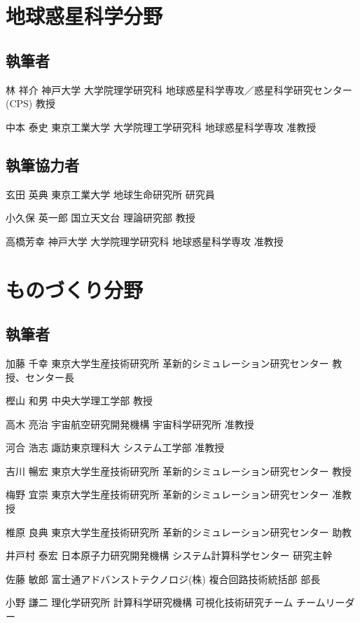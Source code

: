 \begin{執筆者一覧}
\section{地球惑星科学分野}
\subsection{執筆者}
\item
{林 祥介}
{神戸大学 大学院理学研究科 地球惑星科学専攻／惑星科学研究センター (CPS)}
{教授}
\item
{中本 泰史}
{東京工業大学 大学院理工学研究科 地球惑星科学専攻}
{准教授}
\subsection{執筆協力者}
\item
{玄田 英典}
{東京工業大学 地球生命研究所}
{研究員}
\item
{小久保 英一郎}
{国立天文台 理論研究部}
{教授}
\item
{高橋芳幸}
{神戸大学 大学院理学研究科 地球惑星科学専攻}
{准教授}
\section{ものづくり分野}
\subsection{執筆者}
\item
{加藤 千幸}
{東京大学生産技術研究所 革新的シミュレーション研究センター}
{教授、センター長}
\item
{樫山 和男}
{中央大学理工学部}
{教授}
\item
{高木 亮治}
{宇宙航空研究開発機構 宇宙科学研究所}
{准教授}
\item
{河合 浩志}
{諏訪東京理科大 システム工学部}
{准教授}
\item
{吉川 暢宏}
{東京大学生産技術研究所 革新的シミュレーション研究センター}
{教授}
\item
{梅野 宜崇}
{東京大学生産技術研究所 革新的シミュレーション研究センター}
{准教授}
\item
{椎原 良典}
{東京大学生産技術研究所 革新的シミュレーション研究センター}
{助教}
\item
{井戸村 泰宏}
{日本原子力研究開発機構 システム計算科学センター}
{研究主幹}
\item
{佐藤 敏郎}
{富士通アドバンストテクノロジ(株) 複合回路技術統括部}
{部長}
\item
{小野 謙二}
{理化学研究所 計算科学研究機構 可視化技術研究チーム}
{チームリーダー}

\end{執筆者一覧}
